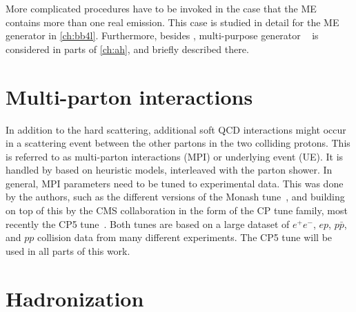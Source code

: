 More complicated procedures have to be invoked in the case that the ME contains more than one real emission. This case is studied in detail for the ME generator \bbfourl in \cref{ch:bb4l}. Furthermore, besides \pythia, multi-purpose generator \herwig~\cite{Bellm:2015jjp,Bahr:2008pv} is considered in parts of \cref{ch:ah}, and briefly described there.




\section{Multi-parton interactions}
\label{sec:mc:mpi}

In addition to the hard scattering, additional soft QCD interactions might occur in a scattering event between the other partons in the two colliding protons. This is referred to as multi-parton interactions (MPI) or underlying event (UE). It is handled by \pythia based on heuristic models, interleaved with the parton shower. In general, MPI parameters need to be tuned to experimental data. This was done by the \pythia authors, such as the different versions of the Monash tune~\cite{Skands:2014pea}, and building on top of this by the CMS collaboration in the form of the CP tune family, most recently the CP5 tune~\cite{CMS:GEN-17-001}. Both tunes are based on a large dataset of $e^+e^-$, $ep$, $p\bar{p}$, and $pp$ collision data from many different experiments. The CP5 tune will be used in all parts of this work.

\section{Hadronization}
\label{sec:mc:hadronization}

